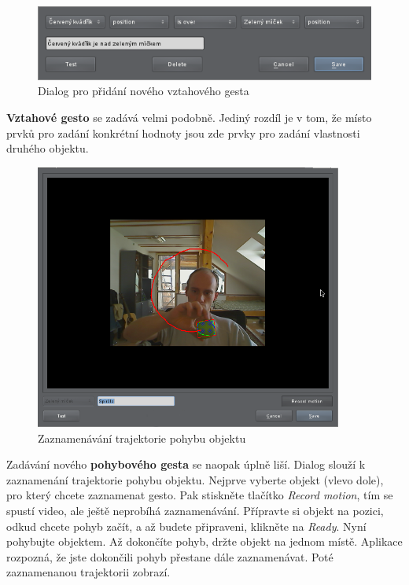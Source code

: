 \begin{figure}[h]
\centering
\includegraphics[width=1.1\textwidth]{newrelationgesture.png}
\caption{Dialog pro přidání nového vztahového gesta}
\label{fig:newrelationgesture}
\end{figure}

\textbf{Vztahové gesto} se zadává velmi podobně. Jediný rozdíl je v tom, že
místo prvků pro zadání konkrétní hodnoty jsou zde prvky pro zadání vlastnosti
druhého objektu.

\begin{figure}[h]
\centering
\includegraphics[width=0.9\textwidth]{newmotiongesture1.png}
\caption{Zaznamenávání trajektorie pohybu objektu}
\label{fig:newrelationgesture1}
\end{figure}

Zadávání nového \textbf{pohybového gesta} se naopak úplně liší. Dialog slouží
k zaznamenání trajektorie pohybu objektu. Nejprve vyberte objekt (vlevo dole),
pro který chcete zaznamenat gesto. Pak stiskněte tlačítko \emph{Record
motion}, tím se spustí video, ale ještě neprobíhá zaznamenávání. Přípravte si
objekt na pozici, odkud chcete pohyb začít, a až budete připraveni, klikněte na
\emph{Ready}. Nyní pohybujte objektem. Až dokončíte pohyb, držte objekt na
jednom místě. Aplikace rozpozná, že jste dokončili pohyb přestane dále
zaznamenávat. Poté zaznamenanou trajektorii zobrazí.

